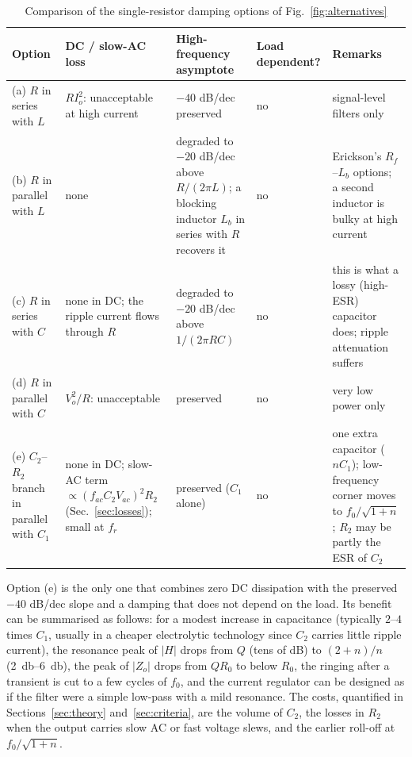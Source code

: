 \documentclass[11pt,a4paper]{article}
\begin{document}
\begin{table}[htb]
\centering
\small
\caption{Comparison of the single-resistor damping options of Fig.~\ref{fig:alternatives}}
\begin{tabular}{@{}P{2.5cm}P{2.7cm}P{3.5cm}P{1.5cm}P{4.2cm}@{}}
\toprule
Option & DC / slow-AC loss & High-frequency asymptote & Load dependent? & Remarks \\
\midrule
(a) $R$ in series with $L$ & $R I_o^2$: unacceptable at high current & $-40$ dB/dec preserved & no & signal-level filters only \\
(b) $R$ in parallel with $L$ & none & degraded to $-20$ dB/dec above $R/(2\pi L)$; a blocking inductor $L_b$ in series with $R$ recovers it & no & Erickson's $R_f$--$L_b$ options; a second inductor is bulky at high current \\
(c) $R$ in series with $C$ & none in DC; the ripple current flows through $R$ & degraded to $-20$ dB/dec above $1/(2\pi R C)$ & no & this is what a lossy (high-ESR) capacitor does; ripple attenuation suffers \\
(d) $R$ in parallel with $C$ & $V_o^2/R$: unacceptable & preserved & no & very low power only \\
(e) $C_2$--$R_2$ branch in parallel with $C_1$ & none in DC; slow-AC term $\propto (f_{ac} C_2 V_{ac})^2 R_2$ (Sec.~\ref{sec:losses}); small at $f_r$ & preserved ($C_1$ alone) & no & one extra capacitor ($n C_1$); low-frequency corner moves to $f_0/\sqrt{1+n}$; $R_2$ may be partly the ESR of $C_2$ \\
\bottomrule
\end{tabular}
\label{tab:alternatives}
\end{table}

Option (e) is the only one that combines zero DC dissipation with the preserved
$-40$ dB/dec slope and a damping that does not depend on the load. Its benefit can be
summarised as follows: for a modest increase in capacitance (typically $2$--$4$ times
$C_1$, usually in a cheaper electrolytic technology since $C_2$ carries little ripple
current), the resonance peak of $|H|$ drops from $Q$ (tens of dB) to
$(2+n)/n$ (\SIrange{2}{6}{\decibel}), the peak of $|Z_o|$ drops from $Q R_0$ to
below $R_0$, the ringing after a transient is cut to a few cycles of $f_0$, and the
current regulator can be designed as if the filter were a simple low-pass with a mild
resonance. The costs, quantified in Sections~\ref{sec:theory} and~\ref{sec:criteria}, are
the volume of $C_2$, the losses in $R_2$ when the output carries slow AC or fast voltage
slews, and the earlier roll-off at $f_0/\sqrt{1+n}$.
\end{document}
